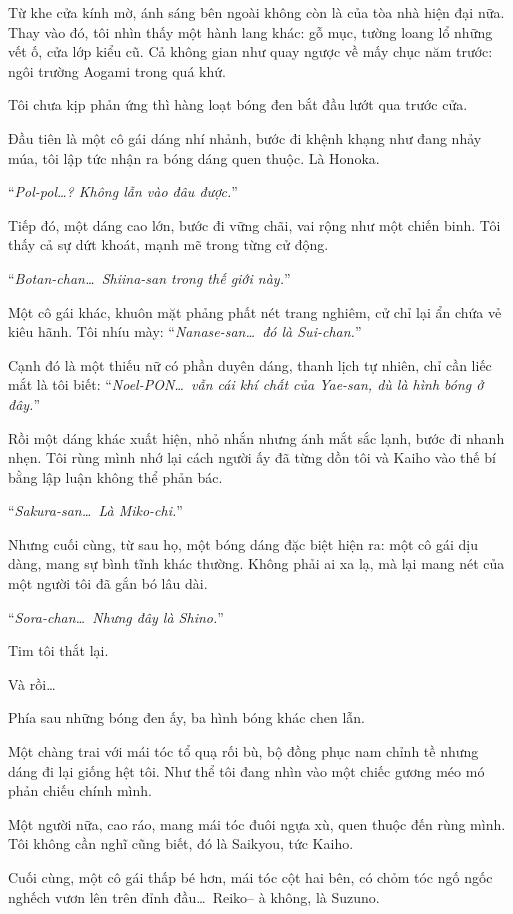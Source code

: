 \documentclass[../main.tex]{subfiles}
\begin{document}
Từ khe cửa kính mờ, ánh sáng bên ngoài không còn là của tòa nhà hiện đại nữa. Thay vào đó, tôi nhìn thấy một hành lang khác: gỗ mục, tường loang lổ những vết ố, cửa lớp kiểu cũ. Cả không gian như quay ngược về mấy chục năm trước: ngôi trường Aogami trong quá khứ.

Tôi chưa kịp phản ứng thì hàng loạt bóng đen bắt đầu lướt qua trước cửa.

Đầu tiên là một cô gái dáng nhí nhảnh, bước đi khệnh khạng như đang nhảy múa, tôi lập tức nhận ra bóng dáng quen thuộc. Là Honoka.

``\textit{Pol-pol\dots? Không lẫn vào đâu được.}''

Tiếp đó, một dáng cao lớn, bước đi vững chãi, vai rộng như một chiến binh. Tôi thấy cả sự dứt khoát, mạnh mẽ trong từng cử động.

``\textit{Botan-chan\dots\ Shiina-san trong thế giới này.}''

Một cô gái khác, khuôn mặt phảng phất nét trang nghiêm, cử chỉ lại ẩn chứa vẻ kiêu hãnh. Tôi nhíu mày: ``\textit{Nanase-san\dots\ đó là Sui-chan.}''

Cạnh đó là một thiếu nữ có phần duyên dáng, thanh lịch tự nhiên, chỉ cần liếc mắt là tôi biết: ``\textit{Noel-PON\dots\ vẫn cái khí chất của Yae-san, dù là hình bóng ở đây.}''

Rồi một dáng khác xuất hiện, nhỏ nhắn nhưng ánh mắt sắc lạnh, bước đi nhanh nhẹn. Tôi rùng mình nhớ lại cách người ấy đã từng dồn tôi và Kaiho vào thế bí bằng lập luận không thể phản bác.

``\textit{Sakura-san\dots\ Là Miko-chi.}''

Nhưng cuối cùng, từ sau họ, một bóng dáng đặc biệt hiện ra: một cô gái dịu dàng, mang sự bình tĩnh khác thường. Không phải ai xa lạ, mà lại mang nét của một người tôi đã gắn bó lâu dài.

``\textit{Sora-chan\dots\ Nhưng đây là Shino.}''

Tim tôi thắt lại.

Và rồi\dots

Phía sau những bóng đen ấy, ba hình bóng khác chen lẫn.

Một chàng trai với mái tóc tổ quạ rối bù, bộ đồng phục nam chỉnh tề nhưng dáng đi lại giống hệt tôi. Như thể tôi đang nhìn vào một chiếc gương méo mó phản chiếu chính mình.

Một người nữa, cao ráo, mang mái tóc đuôi ngựa xù, quen thuộc đến rùng mình. Tôi không cần nghĩ cũng biết, đó là Saikyou, tức Kaiho.

Cuối cùng, một cô gái thấp bé hơn, mái tóc cột hai bên, có chỏm tóc ngố ngốc nghếch vươn lên trên đỉnh đầu\dots\ Reiko-- à không, là Suzuno.
\end{document}
